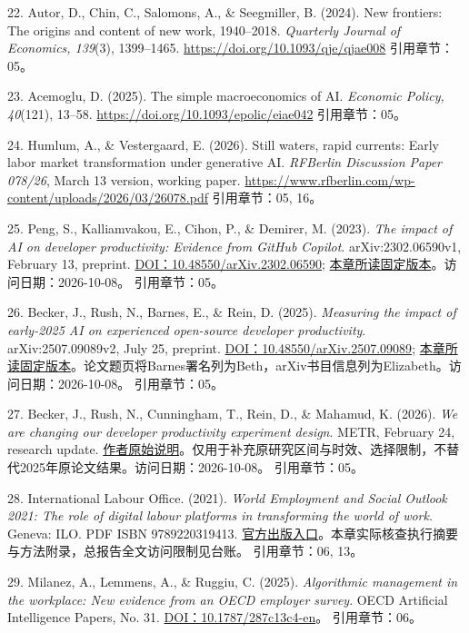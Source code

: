 \documentclass[UTF8,fontset=windows,12pt,a4paper,oneside,openany]{ctexbook}
\begin{document}
22. Autor, D., Chin, C., Salomons, A., \& Seegmiller, B. (2024). New frontiers: The origins and content of new work, 1940–2018. \emph{Quarterly Journal of Economics, 139}(3), 1399–1465. \url{https://doi.org/10.1093/qje/qjae008}
引用章节：05。

23. Acemoglu, D. (2025). The simple macroeconomics of AI. \emph{Economic Policy, 40}(121), 13–58. \url{https://doi.org/10.1093/epolic/eiae042}
引用章节：05。

24. Humlum, A., \& Vestergaard, E. (2026). Still waters, rapid currents: Early labor market transformation under generative AI. \emph{RFBerlin Discussion Paper 078/26}, March 13 version, working paper. \url{https://www.rfberlin.com/wp-content/uploads/2026/03/26078.pdf}
引用章节：05, 16。

25. Peng, S., Kalliamvakou, E., Cihon, P., \& Demirer, M. (2023). \emph{The impact of AI on developer productivity: Evidence from GitHub Copilot}. arXiv:2302.06590v1, February 13, preprint. \href{https://doi.org/10.48550/arXiv.2302.06590}{DOI：10.48550/arXiv.2302.06590}; \href{https://arxiv.org/pdf/2302.06590v1}{本章所读固定版本}。访问日期：2026-10-08。
引用章节：05。

26. Becker, J., Rush, N., Barnes, E., \& Rein, D. (2025). \emph{Measuring the impact of early-2025 AI on experienced open-source developer productivity}. arXiv:2507.09089v2, July 25, preprint. \href{https://doi.org/10.48550/arXiv.2507.09089}{DOI：10.48550/arXiv.2507.09089}; \href{https://arxiv.org/pdf/2507.09089v2}{本章所读固定版本}。论文题页将Barnes署名列为Beth，arXiv书目信息列为Elizabeth。访问日期：2026-10-08。
引用章节：05。

27. Becker, J., Rush, N., Cunningham, T., Rein, D., \& Mahamud, K. (2026). \emph{We are changing our developer productivity experiment design}. METR, February 24, research update. \href{https://metr.org/blog/2026-02-24-uplift-update/}{作者原始说明}。仅用于补充原研究区间与时效、选择限制，不替代2025年原论文结果。访问日期：2026-10-08。
引用章节：05。

28. International Labour Office. (2021). \emph{World Employment and Social Outlook 2021: The role of digital labour platforms in transforming the world of work}. Geneva: ILO. PDF ISBN 9789220319413. \href{https://www.ilo.org/publications/flagship-reports/role-digital-labour-platforms-transforming-world-work}{官方出版入口}。本章实际核查执行摘要与方法附录，总报告全文访问限制见台账。
引用章节：06, 13。

29. Milanez, A., Lemmens, A., \& Ruggiu, C. (2025). \emph{Algorithmic management in the workplace: New evidence from an OECD employer survey}. OECD Artificial Intelligence Papers, No. 31. \href{https://doi.org/10.1787/287c13c4-en}{DOI：10.1787/287c13c4-en}。
引用章节：06。
\end{document}
